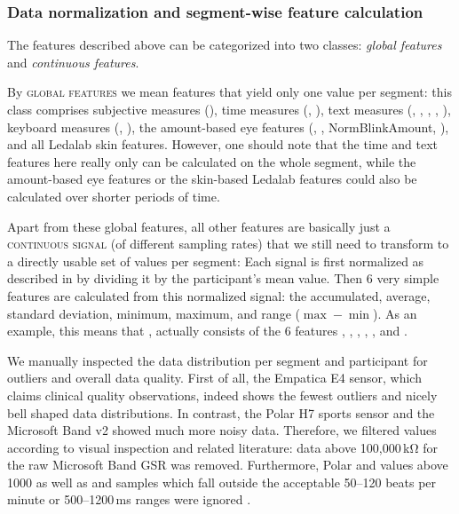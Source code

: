 \documentclass[output=paper]{langsci/langscibook}
\begin{document}

\subsubsection{Data normalization and segment-wise feature calculation}
\label{sec:datanorm}
The features described above can be categorized into two classes: \textit{global features} and \textit{continuous features}.

By \textsc{global features} we mean features that yield only one value per segment: this class comprises subjective measures (\subjCL{}), time measures (\petime{}, \lnpetime{}), text measures (\bleu{}, \hbleu{}, \ter{}, \hter{}, \sentencelength{}), keyboard measures (\apr{}, \pwr{}), the amount-based eye features (\blinkamount{}, \fixamount{}, Norm\-Blink\-Amount, \normfixamount{}), and all Ledalab skin features. However, one should note that the time and text features here really only can be calculated on the whole segment, while the amount-based eye features or the skin-based Ledalab features could also be calculated over shorter periods of time.

Apart from these global features, all other features are basically just a \textsc{continuous signal} (of different sampling rates) that we still need to transform to a directly usable set of values per segment: Each signal is first normalized as described in \cite{chen2016robust} by dividing it by the participant's mean value. Then 6 very simple features are calculated from this normalized signal: the accumulated, average, standard deviation, minimum, maximum, and range ($\max - \min$). As an example, this means that \gsr{}{}, actually consists of the 6 features , , , , , and .

We manually inspected the data distribution per segment and participant for outliers and overall data quality. First of all, the Empatica E4 sensor, which claims clinical quality observations, indeed shows the fewest outliers and nicely bell shaped data distributions. In contrast, the Polar H7 sports sensor and the Microsoft Band v2 showed much more noisy data. Therefore, we filtered values according to visual inspection and related literature: data above 100,000\,kΩ for the raw Microsoft Band GSR was removed. Furthermore, Polar \rmssd{}{} and \sdnn{}{} values above 1000 \citep{van2018normal} as well as  and  samples which fall outside the acceptable 50--120 beats per minute or 500--1200\,ms ranges were ignored \citep{shaffer2017overview}.
\end{document}
